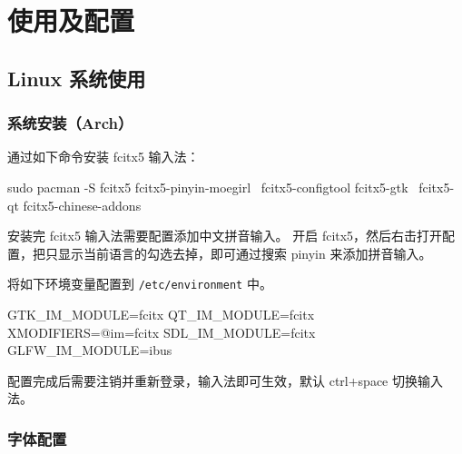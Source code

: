 \chapter{使用及配置}

\section{Linux 系统使用}

\subsection{系统安装（Arch）}


通过如下命令安装 fcitx5 输入法：

\begin{lstcode}[numbers=none]
  sudo pacman -S fcitx5 fcitx5-pinyin-moegirl \
        fcitx5-configtool fcitx5-gtk \
        fcitx5-qt fcitx5-chinese-addons
\end{lstcode}

安装完 fcitx5 输入法需要配置添加中文拼音输入。
开启 fcitx5，然后右击打开配置，把只显示当前语言的勾选去掉，即可通过搜索 pinyin 来添加拼音输入。


将如下环境变量配置到 \lstinline{/etc/environment} 中。

\begin{lstcode}[numbers=none]
  GTK_IM_MODULE=fcitx
  QT_IM_MODULE=fcitx
  XMODIFIERS=@im=fcitx
  SDL_IM_MODULE=fcitx
  GLFW_IM_MODULE=ibus
\end{lstcode}

配置完成后需要注销并重新登录，输入法即可生效，默认 ctrl+space 切换输入法。

\subsection{字体配置}

